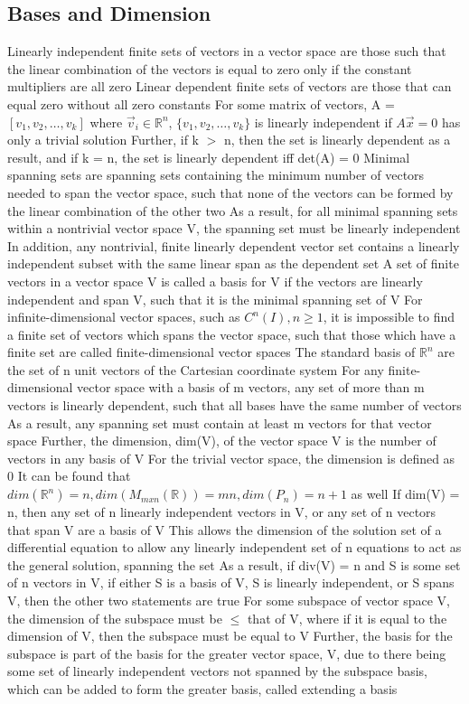 \documentclass[11 pt, twoside]{article}
\newenvironment{outline*}
{
	\begin{outline}[enumerate]
	}
	{\end{outline}
}
\begin{document}
\subsection{Bases and Dimension}
\begin{outline*}
\1 Linearly independent finite sets of vectors in a vector space are those such that the linear combination of the vectors is equal to zero only if the constant multipliers are all zero
\2 Linear dependent finite sets of vectors are those that can equal zero without all zero constants
\2 For some matrix of vectors, A = $[v_1, v_2, \dots, v_k]$ where $\vec{v}_i \in \mathbb{R}^n$, $\{v_1, v_2, \dots, v_k\}$ is linearly independent if $A\vec{x} = 0$ has only a trivial solution
\3 Further, if k $>$ n, then the set is linearly dependent as a result, and if k = n, the set is linearly dependent iff det(A) = 0
\1 Minimal spanning sets are spanning sets containing the minimum number of vectors needed to span the vector space, such that none of the vectors can be formed by the linear combination of the other two
\2 As a result, for all minimal spanning sets within a nontrivial vector space V, the spanning set must be linearly independent
\2 In addition, any nontrivial, finite linearly dependent vector set contains a linearly independent subset with the same linear span as the dependent set
\1 A set of finite vectors in a vector space V is called a basis for V if the vectors are linearly independent and span V, such that it is the minimal spanning set of V
\2 For infinite-dimensional vector spaces, such as $C^n(I), n \geq 1$, it is impossible to find a finite set of vectors which spans the vector space, such that those which have a finite set are called finite-dimensional vector spaces
\2 The standard basis of $\mathbb{R}^n$ are the set of n unit vectors of the Cartesian coordinate system
\1 For any finite-dimensional vector space with a basis of m vectors, any set of more than m vectors is linearly dependent, such that all bases have the same number of vectors
\2 As a result, any spanning set must contain at least m vectors for that vector space
\2 Further, the dimension, dim(V), of the vector space V is the number of vectors in any basis of V
\3 For the trivial vector space, the dimension is defined as 0
\3 It can be found that $dim(\mathbb{R}^n) = n, dim(M_{mxn}(\mathbb{R})) = mn, dim(P_n) = n + 1$ as well
\2 If dim(V) = n, then any set of n linearly independent vectors in V, or any set of n vectors that span V are a basis of V
\3 This allows the dimension of the solution set of a differential equation to allow any linearly independent set of n equations to act as the general solution, spanning the set
\3 As a result, if div(V) = n and S is some set of n vectors in V, if either S is a basis of V, S is linearly independent, or S spans V, then the other two statements are true
\2 For some subspace of vector space V, the dimension of the subspace must be $\leq$ that of V, where if it is equal to the dimension of V, then the subspace must be equal to V
\3 Further, the basis for the subspace is part of the basis for the greater vector space, V, due to there being some set of linearly independent vectors not spanned by the subspace basis, which can be added to form the greater basis, called extending a basis
\end{outline*}
\end{document}
